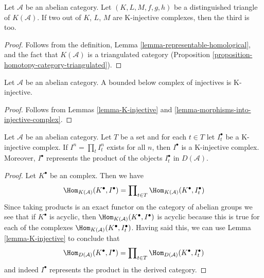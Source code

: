 \begin{lemma}
\label{lemma-triangle-K-injective}
Let $\mathcal{A}$ be an abelian category. Let $(K, L, M, f, g, h)$
be a distinguished triangle of $K(\mathcal{A})$. If two out of
$K$, $L$, $M$ are K-injective complexes, then the third is too.
\end{lemma}

\begin{proof}
Follows from the definition,
Lemma \ref{lemma-representable-homological}, and
the fact that $K(\mathcal{A})$ is a triangulated category
(Proposition \ref{proposition-homotopy-category-triangulated}).
\end{proof}

\begin{lemma}
\label{lemma-bounded-below-injectives-K-injective}
Let $\mathcal{A}$ be an abelian category. A bounded below complex of
injectives is K-injective.
\end{lemma}

\begin{proof}
Follows from
Lemmas \ref{lemma-K-injective} and
\ref{lemma-morphisms-into-injective-complex}.
\end{proof}

\begin{lemma}
\label{lemma-product-K-injective}
Let $\mathcal{A}$ be an abelian category. Let $T$ be a set and for
each $t \in T$ let $I_t^\bullet$ be a K-injective complex. If
$I^n = \prod_t I_t^n$ exists for all $n$, then $I^\bullet$ is
a K-injective complex. Moreover, $I^\bullet$ represents the
product of the objects $I_t^\bullet$ in $D(\mathcal{A})$.
\end{lemma}

\begin{proof}
Let $K^\bullet$ be an complex. Then we have
$$
\Hom_{K(\mathcal{A})}(K^\bullet, I^\bullet)
=
\prod\nolimits_{t \in T} \Hom_{K(\mathcal{A})}(K^\bullet, I_t^\bullet)
$$
Since taking products is an exact functor on the category of abelian groups
we see that if $K^\bullet$ is acyclic, then
$\Hom_{K(\mathcal{A})}(K^\bullet, I^\bullet)$ is acyclic because
this is true for each of the complexes
$\Hom_{K(\mathcal{A})}(K^\bullet, I_t^\bullet)$.
Having said this, we can use
Lemma \ref{lemma-K-injective}
to conclude that
$$
\Hom_{D(\mathcal{A})}(K^\bullet, I^\bullet)
=
\prod\nolimits_{t \in T} \Hom_{D(\mathcal{A})}(K^\bullet, I_t^\bullet)
$$
and indeed $I^\bullet$ represents the product in the derived category.
\end{proof}

